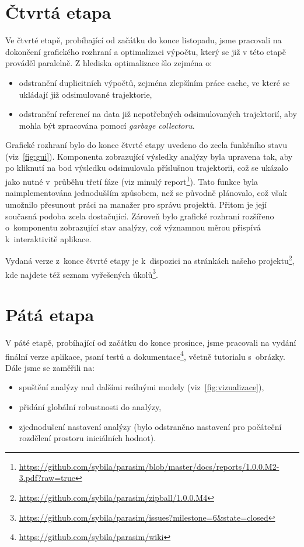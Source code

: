 \documentclass{parasim}
\begin{document}
\section{Čtvrtá etapa}

Ve čtvrté etapě, probíhající od začátku do konce listopadu, jsme pracovali na dokončení grafického rozhraní a
optimalizaci výpočtu, který se již v této etapě prováděl paralelně. Z hlediska opti\-malizace šlo zejména o:

\begin{itemize}
	\item	odstranění duplicitních výpočtů, zejména zlepšíním práce cache, ve které se ukládají již odsimulované trajektorie,
	\item	odstranění referencí na data již nepotřebných odsimulovaných trajektorií, aby mohla být zpracována pomocí \textit{garbage collectoru}.
\end{itemize}

Grafické rozhraní bylo do konce čtvrté etapy uvedeno do zcela funkčního stavu (viz \figurename\,\ref{fig:gui}). Komponenta zobrazující výsledky analýzy
byla upravena tak, aby po kliknutí na bod výsledku odsimulovala příslušnou trajektorii, což se ukázalo jako nutné v~průběhu třetí fáze (viz minulý report\footnote{
\url{https://github.com/sybila/parasim/blob/master/docs/reports/1.0.0.M2-3.pdf?raw=true}}). Tato funkce byla naimplementována jednodušším způsobem, než se původně plánovalo,
což však umožnilo přesunout práci na manažer pro správu projektů. Přitom je její současná podoba zcela dostačující. Zároveň bylo grafické rozhraní rozšířeno o~komponentu
zobrazující stav analýzy, což významnou měrou přispívá k~interaktivitě aplikace.

Vydaná verze z~konce čtvrté etapy je k~dispozici na stránkách našeho projektu\footnote{\url{https://github.com/sybila/parasim/zipball/1.0.0.M4}},
kde najdete též seznam vyřešených úkolů\footnote{\url{https://github.com/sybila/parasim/issues?milestone=6&state=closed}}.

\section{Pátá etapa}

V páté etapě, probíhající od začátku do konce prosince, jsme pracovali na vydání finální verze aplikace, psaní testů a dokumentace\footnote{\url{https://github.com/sybila/parasim/wiki}},
včetně tutorialu s~obrázky. Dále jsme se zaměřili na: 

\begin{itemize}
	\item	spuštění analýzy nad dalšími reálnými modely (viz \figurename\,\ref{fig:vizualizace}),
	\item	přidání globální robustnosti do analýzy,
	\item	zjednodušení nastavení analýzy (bylo odstraněno nastavení pro počáteční rozdělení prostoru iniciálních hodnot).
\end{itemize}
\end{document}
